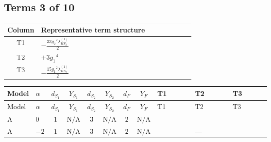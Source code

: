 \documentclass[8pt]{article}
\begin{document}
\begin{landscape}
\subsection*{Terms 3 of 10}
\begin{center}
\begin{tabular}{@{}c >{\raggedright\arraybackslash}p{0.82\linewidth}@{}}
\toprule
Column & Representative term structure \\
\midrule
T1 & \(\displaystyle -\frac{33 {g_2}^2 {\lambda_{HS_2}^{(1)}}}{2}\) \\
\midrule
T2 & \(\displaystyle +3 {g_1}^4\) \\
\midrule
T3 & \(\displaystyle -\frac{15 {g_1}^2 {\lambda_{HS_2}^{(1)}}}{2}\) \\
\midrule
\bottomrule
\end{tabular}
\end{center}
\smallskip
\tiny
\begin{longtable}{@{}llcccccc >{\raggedright\arraybackslash}p{0.21\linewidth} >{\raggedright\arraybackslash}p{0.21\linewidth} >{\raggedright\arraybackslash}p{0.21\linewidth}@{}}
\toprule
Model & $\alpha$ & $d_{S_1}$ & $Y_{S_1}$ & $d_{S_2}$ & $Y_{S_2}$ & $d_F$ & $Y_F$ & T1 & T2 & T3 \\
\midrule
\endfirsthead
\toprule
Model & $\alpha$ & $d_{S_1}$ & $Y_{S_1}$ & $d_{S_2}$ & $Y_{S_2}$ & $d_F$ & $Y_F$ & T1 & T2 & T3 \\
\midrule
\endhead
A & $0$ & $1$ & $\text{N/A}$ & $3$ & $\text{N/A}$ & $2$ & $\text{N/A}$ & \scriptsize\adjustbox{max width=\linewidth}{$\begin{gathered} -\frac{33 {g_2}^2 {\lambda_{HS_2}^{(1)}}}{2}\end{gathered}$} & \scriptsize\adjustbox{max width=\linewidth}{$\begin{gathered} +3 {g_1}^4\end{gathered}$} & \scriptsize\adjustbox{max width=\linewidth}{$\begin{gathered} -\frac{15 {g_1}^2 {\lambda_{HS_2}^{(1)}}}{2}\end{gathered}$} \\
\midrule
A & $-2$ & $1$ & $\text{N/A}$ & $3$ & $\text{N/A}$ & $2$ & $\text{N/A}$ & \scriptsize\adjustbox{max width=\linewidth}{$\begin{gathered} -\frac{33 {g_2}^2 {\lambda_{HS_2}^{(1)}}}{2}\end{gathered}$} & --- & \scriptsize\adjustbox{max width=\linewidth}{$\begin{gathered} -\frac{3 {g_1}^2 {\lambda_{HS_2}^{(1)}}}{2}\end{gathered}$} \\

\end{longtable}
\end{landscape}
\end{document}
